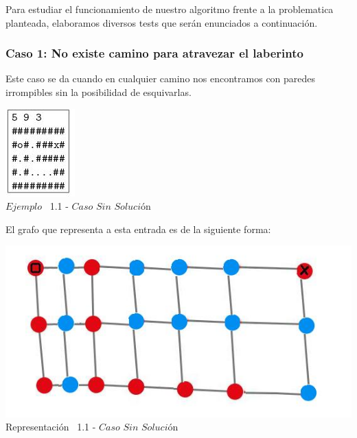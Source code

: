 \indent Para estudiar el funcionamiento de nuestro algoritmo frente a la problematica planteada, elaboramos diversos tests que ser\'an enunciados a continuaci\'on.\\

\begin{center}
 \subsubsection*{Caso 1: No existe camino para atravezar el laberinto}
\end{center}

Este caso se da cuando en cualquier camino nos encontramos con paredes irrompibles sin la posibilidad de esquivarlas.\\
 
\vspace*{0.3cm} \vspace*{0.3cm}
  \begin{center}
 \includegraphics[scale=1.60]{./EJ1/ej1sinsolucion.jpeg}
\\{$Ejemplo$ \ 1.1 - $Caso$ $Sin$ $Soluci$\'on}
  \end{center}
  \vspace*{0.3cm}

El grafo que representa a esta entrada es de la siguiente forma:\\

\vspace*{0.3cm} \vspace*{0.3cm}
  \begin{center}
 \includegraphics[scale=0.5]{./EJ1/ej1grafosinsolucion.jpeg}
 \\{Representaci\'on \ 1.1 - $Caso$ $Sin$ $Soluci$\'on}
  \end{center}
  \vspace*{0.3cm}

